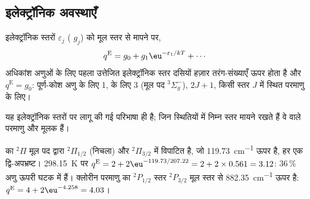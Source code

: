 \subsection*{इलेक्ट्रॉनिक अवस्थाएँ}

\begin{proposition}[इलेक्ट्रॉनिक विभाजन फलन]\label{prop:b3:partition-functions:q-elec}
इलेक्ट्रॉनिक स्तरों $\varepsilon_j$ ( $g_j$) को मूल
स्तर से मापने पर,
\[
  q^{\mathrm E} = g_0 + g_1\eu^{-\varepsilon_1/kT} + \cdots
\]
अधिकांश अणुओं के लिए पहला उत्तेजित इलेक्ट्रॉनिक स्तर दसियों हज़ार
तरंग-संख्याएँ ऊपर होता है और $q^{\mathrm E} = g_0$: पूर्ण-कोश अणु के लिए 1,
 के लिए 3 (मूल पद ${}^3\Sigma_g^-$), $2J + 1$, किसी स्तर $J$ में स्थित परमाणु के लिए।
\end{proposition}

यह इलेक्ट्रॉनिक स्तरों पर लागू की गई परिभाषा ही है; जिन स्थितियों में निम्न
स्तर मायने रखते हैं वे  वाले परमाणु और मूलक हैं।

\begin{example}[नाइट्रिक ऑक्साइड और क्लोरीन परमाणु]\label{ex:b3:partition-functions:no-cl}
 का ${}^2\Pi$ मूल पद  द्वारा ${}^2\Pi_{1/2}$ (निचला)
और ${}^2\Pi_{3/2}$ में विपाटित है, जो \qty{119.73}{cm^{-1}} ऊपर है, हर एक द्वि-अपभ्रष्ट। \qty{298.15}{K} पर
$q^{\mathrm E} = 2 + 2\eu^{-119.73/207.22} = 2 + 2\times0.561 = 3.12$: 36\,\% अणु
ऊपरी घटक में हैं। क्लोरीन परमाणु का ${}^2P_{1/2}$ स्तर ${}^2P_{3/2}$ मूल स्तर से \qty{882.35}{cm^{-1}}
ऊपर है: $q^{\mathrm E} = 4 + 2\eu^{-4.258} = 4.03$।
\end{example}

